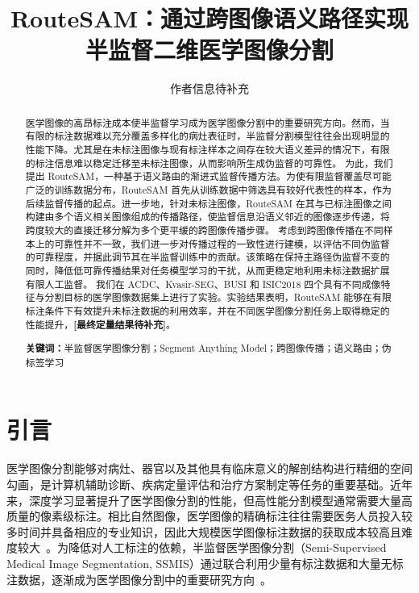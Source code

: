 \documentclass[UTF8,a4paper,10pt,twocolumn]{ctexart}
\title{RouteSAM：通过跨图像语义路径实现半监督二维医学图像分割}
\author{作者信息待补充}
\date{}
\begin{document}
\maketitle


\begin{abstract}
医学图像的高昂标注成本使半监督学习成为医学图像分割中的重要研究方向。然而，当有限的标注数据难以充分覆盖多样化的病灶表征时，半监督分割模型往往会出现明显的性能下降。尤其是在未标注图像与现有标注样本之间存在较大语义差异的情况下，有限的标注信息难以稳定迁移至未标注图像，从而影响所生成伪监督的可靠性。
为此，我们提出 RouteSAM，一种基于语义路由的渐进式监督传播方法。为使有限监督覆盖尽可能广泛的训练数据分布，RouteSAM 首先从训练数据中筛选具有较好代表性的样本，作为后续监督传播的起点。进一步地，针对未标注图像，RouteSAM 在其与已标注图像之间构建由多个语义相关图像组成的传播路径，使监督信息沿语义邻近的图像逐步传递，将跨度较大的直接迁移分解为多个更平缓的跨图像传播步骤。
考虑到跨图像传播在不同样本上的可靠性并不一致，我们进一步对传播过程的一致性进行建模，以评估不同伪监督的可靠程度，并据此调节其在半监督训练中的贡献。该策略在保持主路径伪监督不变的同时，降低低可靠传播结果对任务模型学习的干扰，从而更稳定地利用未标注数据扩展有限人工监督。
我们在 ACDC、Kvasir-SEG、BUSI 和 ISIC2018 四个具有不同成像特征与分割目标的医学图像数据集上进行了实验。实验结果表明，RouteSAM 能够在有限标注条件下有效提升未标注数据的利用效率，并在不同医学图像分割任务上取得稳定的性能提升，\textbf{[最终定量结果待补充]}。

\noindent\textbf{关键词：}半监督医学图像分割；Segment Anything Model；跨图像传播；语义路由；伪标签学习
\end{abstract}




\section{引言}

医学图像分割能够对病灶、器官以及其他具有临床意义的解剖结构进行精细的空间勾画，是计算机辅助诊断、疾病定量评估和治疗方案制定等任务的重要基础。近年来，深度学习显著提升了医学图像分割的性能，但高性能分割模型通常需要大量高质量的像素级标注。相比自然图像，医学图像的精确标注往往需要医务人员投入较多时间并具备相应的专业知识，因此大规模医学图像标注数据的获取成本较高且难度较大~\cite{hesamian2019deep,tajbakhsh2020embracing}。为降低对人工标注的依赖，半监督医学图像分割（Semi-Supervised Medical Image Segmentation, SSMIS）通过联合利用少量有标注数据和大量无标注数据，逐渐成为医学图像分割中的重要研究方向~\cite{jiao2024learning}。
\end{document}
